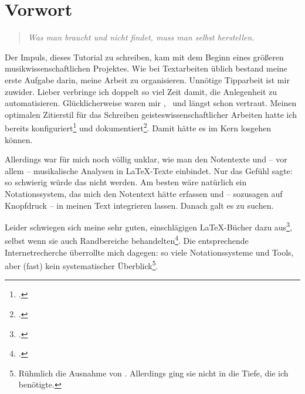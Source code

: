 %
%
%



\section{Vorwort}

\begin{quote}\textit{Was man braucht und nicht findet, muss man selbst herstellen.}
\end{quote}

Der Impuls, dieses Tutorial zu schreiben, kam mit dem Beginn eines größeren
musikwissenschaftlichen Projektes. Wie bei Textarbeiten üblich bestand meine
erste Aufgabe darin, meine Arbeit zu organisieren. Unnötige Tipparbeit ist mir
zuwider. Lieber verbringe ich doppelt so viel Zeit damit, die Anlegenheit zu
automatisieren. Glücklicherweise waren mir \acc{\LaTeX}, \ und
 längst schon vertraut. Meinen optimalen Zitierstil für das
Schreiben geisteswissenschaftlicher Arbeiten hatte ich bereits
konfiguriert\footcite[vgl.][\nopage wp]{Reincke2018a} und
dokumentiert\footcite[vgl][2ff]{Reincke2018b}. Damit hätte es im Kern losgehen
können.

Allerdings war für mich noch völlig unklar, wie man den Notentexte und -- vor
allem -- musikalische Analysen in \LaTeX-Texte einbindet. Nur das Gefühl sagte:
so schwierig würde das nicht werden. Am besten wäre natürlich ein
No\-ta\-tions\-system, das mich den Notentext hätte erfassen und -- sozusagen auf
Knopfdruck -- in meinen Text integrieren lassen. Danach galt es zu suchen.

Leider schwiegen sich meine sehr guten, einschlägigen \LaTeX-Bücher dazu
aus\footcite[ vgl.][vi ff, insbesondere 905 u. 909: das umfangreiche Register
erwähnt weder Musik im allgemeinen noch LilyPond oder MusiX\TeX im
Besonderen]{Voss2012a}, selbst wenn sie auch Randbereiche
behandelten\footcite[vgl.][vii ff, insbesondere 1080 u.
1087: auch dieses umfangreiche Register erwähnt weder Musik im allgemeinen noch
LilyPond oder MusiX\TeX im Besonderen.]{MitGoo2005a}. Die entsprechende
Internetrecherche überrollte mich dagegen: so viele Notationssysteme und Tools,
aber (fast) kein systematischer Überblick\footnote{Rühmlich die Ausnahme von
\cite[][\nopage wp]{Thoma2018a}. Allerdings ging sie nicht in die Tiefe, die ich
benötigte.}.

